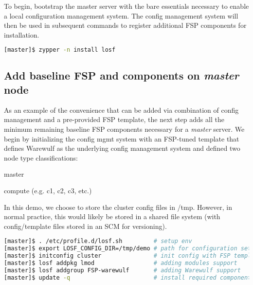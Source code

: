 \documentclass[letterpaper]{article}
\begin{document}
To begin, bootstrap the master server with the bare essentials necessary to
enable a local configuration management system. The config management system
will then be used in subsequent commands to register additional FSP components
for installation.

\vspace*{0.2cm}

\begin{lstlisting}[language=bash]
[master]$ zypper -n install losf
\end{lstlisting}


\subsection{Add baseline FSP and components on {\em master} node}

As an example of the convenience that can be added via combination of config
management and a pre-provided FSP template, the next step adds all the minimum
remaining baseline FSP components necessary for a {\em master} server. We begin
by initializing the config mgmt system with an FSP-tuned template that defines
Warewulf as the underlying config management system and defined two node type
classifications:
\begin{itemize*}
\item master
\item compute (e.g. c1, c2, c3, etc.)
\end{itemize*}
In this demo, we choose to store the cluster config files in /tmp. However, in
normal practice, this would likely be stored in a shared file system (with
config/template files stored in an SCM for versioning).

\vspace*{0.2cm}


\begin{lstlisting}[language=bash,keywords={}]
[master]$ . /etc/profile.d/losf.sh         # setup env
[master]$ export LOSF_CONFIG_DIR=/tmp/demo # path for configuration setup
[master]$ initconfig cluster               # init config with FSP template
[master]$ losf addpkg lmod                 # adding modules support
[master]$ losf addgroup FSP-warewulf       # adding Warewulf support
[master]$ update -q                        # install required components
\end{lstlisting}
\end{document}

